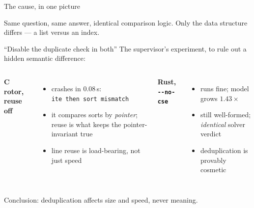 \documentclass[aspectratio=169]{beamer}
\newcommand{\lab}[1]{{\footnotesize\color{ink!65}#1}}
\begin{document}
\begin{frame}{The cause, in one picture}
  \centering\vspace{0.3em}
  \vfill
  \lab{Same question, same answer, identical comparison logic. Only the data
       structure differs --- a list versus an index.}
\end{frame}

\begin{frame}{``Disable the duplicate check in both''}
  The supervisor's experiment, to rule out a hidden semantic difference:
  \vspace{0.3em}
  \begin{columns}[T]
      \textbf{C rotor, reuse off}
      \begin{itemize}\setlength\itemsep{0.2em}\footnotesize
        \item \alert{crashes} in 0.08\,s:\\ \texttt{ite then sort mismatch}
        \item it compares sorts by \emph{pointer}; reuse is what keeps the
              pointer-invariant true
        \item line reuse is load-bearing, not just speed
      \end{itemize}
      \textbf{Rust, \texttt{-{}-no-cse}}
      \begin{itemize}\setlength\itemsep{0.2em}\footnotesize
        \item runs fine; model grows $1.43\times$
        \item still well-formed; \emph{identical} solver verdict
        \item deduplication is provably cosmetic
      \end{itemize}
  \end{columns}
  \vfill
  \lab{Conclusion: deduplication affects size and speed, never meaning.}
\end{frame}
\end{document}
